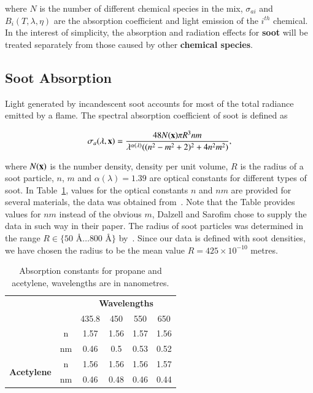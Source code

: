 where $N$ is the number of different chemical species in the mix, $\sigma_{ai}$ and $B_i(T, \lambda, \eta)$ are the absorption coefficient and light emission of the $i^{th}$ chemical.
In the interest of simplicity, the absorption and radiation effects for \textbf{soot} will be treated separately from those caused by other \textbf{chemical species}.

\subsection{Soot Absorption}
\label{sec:soot_absorption}

Light generated by incandescent soot accounts for most of the total radiance emitted by a flame. 
The spectral absorption coefficient of soot is defined as

\begin{equation}
\sigma_a(\lambda, \mathbf{x}) = \frac{48 N(\mathbf{x}) \pi R^3 n m}{\lambda^{\alpha(\lambda)} ((n^2 - m^2 +2)^2 + 4 n^2 m^2)},
\end{equation}

where $N(\mathbf{x})$ is the number density, density per unit volume, $R$ is the radius of a soot particle, $n$, $m$ and $\alpha(\lambda) = 1.39$ are optical constants for different types of soot.
In Table~\ref{tb:soot_absorption_coefficients}, values for the optical constants $n$ and $nm$ are provided for several materials, the data was obtained from~\cite{Dalzell:1969}.
Note that the Table provides values for $nm$ instead of the obvious $m$, Dalzell and Sarofim chose to supply the data in such way in their paper.
The radius of soot particles was determined in the range $R \in \lbrace 50\mbox{~\AA} \ldots 800\mbox{~\AA} \rbrace $ by~\cite{Dalzell:1969}.
Since our data is defined with soot densities, we have chosen the radius to be the mean value $R = 425 \times 10^{-10}$ metres.

\begin{table}[htbp!]
\centering
\caption{Absorption constants for propane and acetylene, wavelengths are in nanometres.}
\label{tb:soot_absorption_coefficients}
\begin{tabular}{cc|c|c|c|c|}
\cline{3-6}
                                                 &    & \multicolumn{4}{c|}{\textbf{Wavelengths}} \\ \cline{3-6} 
                                                 &    & 435.8   & 450    & 550   & 650   \\ \hhline{--|=|=|=|=|}
\multicolumn{1}{|c|}{\multirow{2}{*}{\textbf{Propane}}}   & \multicolumn{1}{c||}{n}  & 1.57    & 1.56   & 1.57  & 1.56  \\ \cline{2-6} 
\multicolumn{1}{|c|}{}                           & \multicolumn{1}{c||}{nm} & 0.46    & 0.5    & 0.53  & 0.52  \\ \hline
\multicolumn{1}{|c|}{\multirow{2}{*}{\textbf{Acetylene}}} & \multicolumn{1}{c||}{n}  & 1.56    & 1.56   & 1.56  & 1.57  \\ \cline{2-6} 
\multicolumn{1}{|c|}{}                           & \multicolumn{1}{c||}{nm} & 0.46    & 0.48   & 0.46  & 0.44  \\ \hline
\end{tabular}
\end{table}

